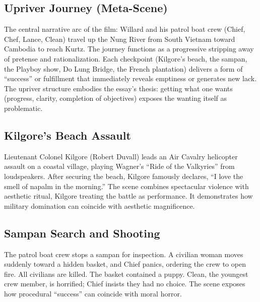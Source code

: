 \begin{minipage}{\textwidth}
	\subsection*{Upriver Journey (Meta-Scene)}
	\label{scene:upriver-journey}

	The central narrative arc of the film: Willard and his patrol boat crew (Chief, Chef, Lance,
	Clean) travel up the Nung River from South Vietnam toward Cambodia to reach Kurtz. The journey
	functions as a progressive stripping away of pretense and rationalization. Each checkpoint
	(Kilgore's beach, the sampan, the Playboy show, Do Lung Bridge, the French plantation)
	delivers a form of ``success'' or fulfillment that immediately reveals emptiness or generates
	new lack. The upriver structure embodies the essay's thesis: getting what one wants (progress,
	clarity, completion of objectives) exposes the wanting itself as problematic.
\end{minipage}
\bigskip

\begin{minipage}{\textwidth}
	\subsection*{Kilgore's Beach Assault}
	\label{scene:kilgore-beach}

	Lieutenant Colonel Kilgore (Robert Duvall) leads an Air Cavalry helicopter assault on a coastal
	village, playing Wagner's ``Ride of the Valkyries'' from loudspeakers. After securing the
	beach, Kilgore famously declares, ``I love the smell of napalm in the morning.'' The scene
	combines spectacular violence with aesthetic ritual, Kilgore treating the battle as
	performance. It demonstrates how military domination can coincide with aesthetic magnificence.
\end{minipage}
\bigskip

\begin{minipage}{\textwidth}
	\subsection*{Sampan Search and Shooting}
	\label{scene:sampan}

	The patrol boat crew stops a sampan for inspection. A civilian woman moves suddenly toward a
	hidden basket, and Chief panics, ordering the crew to open fire. All civilians are killed. The
	basket contained a puppy. Clean, the youngest crew member, is horrified; Chief insists they
	had no choice. The scene exposes how procedural ``success'' can coincide with moral horror.
\end{minipage}
\bigskip

